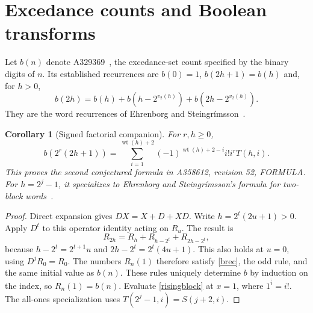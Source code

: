 \documentclass[11pt]{article}
\newcommand{\wt}{\operatorname{wt}}
\newtheorem{corollary}[theorem]{Corollary}
\begin{document}
\section{Excedance counts and Boolean transforms}
Let $b(n)$ denote A329369~\cite{excentry}, the excedance-set count
specified by the binary digits of $n$. Its established recurrences are
$b(0)=1$, $b(2h+1)=b(h)$ and, for $h>0$,
\begin{equation}\label{brec}
 b(2h)=b(h)+b(h-2^{v_2(h)})+b(2h-2^{v_2(h)}).
\end{equation}
They are the word recurrences of Ehrenborg and
Steingr\'imsson~\cite[Propositions 2.1 and 2.5]{excedance}.

\begin{corollary}[Signed factorial companion]\label{signed}
For $r,h\geq0$,
\begin{equation}\label{factorialsum}
 b(2^r(2h+1))=\sum_{i=1}^{\wt(h)+2}
 (-1)^{\wt(h)+2-i}i!i^rT(h,i).
\end{equation}
This proves the second conjectured formula in A358612, revision 52,
FORMULA. For $h=2^j-1$, it specializes to Ehrenborg and
Steingr\'imsson's formula for two-block words~\cite[Proposition 6.5]{excedance}.
\end{corollary}
\begin{proof}
Direct expansion gives $DX=X+ D+XD$. Write $h=2^t(2u+1)>0$.
Apply $D^t$ to this operator identity acting on $R_u$. The result is
\[
 R_{2h}=R_h+R_{h-2^t}+R_{2h-2^t},
\]
because $h-2^t=2^{t+1}u$ and $2h-2^t=2^t(4u+1)$.
This also holds at $u=0$, using $D^jR_0=R_0$.
The numbers $R_n(1)$ therefore satisfy \eqref{brec}, the odd rule,
and the same initial value as $b(n)$. These rules uniquely determine
$b$ by induction on the index, so $R_n(1)=b(n)$.
Evaluate \eqref{risingblock} at $x=1$, where
$1^{\overline i}=i!$. The all-ones specialization uses
$T(2^j-1,i)=S(j+2,i)$.
\end{proof}
\end{document}
